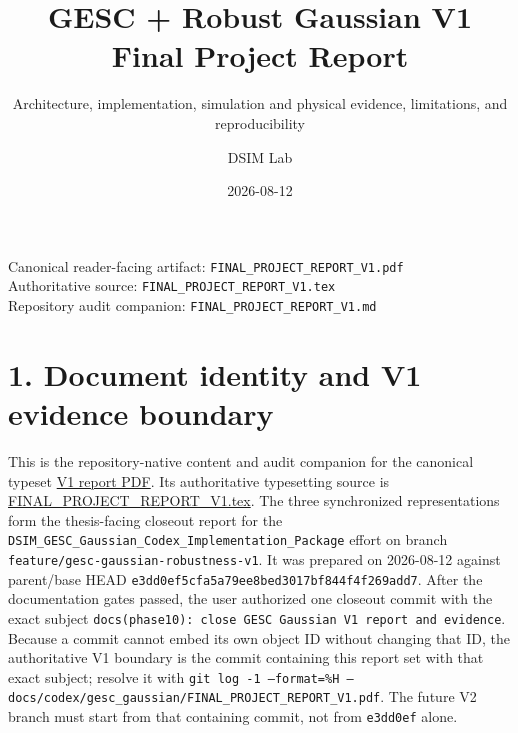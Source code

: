 \documentclass[
  10pt,
  letterpaper,
]{article}
\title{GESC + Robust Gaussian V1 Final Project Report}
\subtitle{Architecture, implementation, simulation and physical evidence, limitations, and reproducibility}
\author{DSIM Lab}
\date{2026-08-12}
\begin{document}
\maketitle
\thispagestyle{empty}

\begin{center}
\end{center}
\vfill
\begin{center}
\small Canonical reader-facing artifact: \texttt{FINAL\_PROJECT\_REPORT\_V1.pdf}\\
Authoritative source: \texttt{FINAL\_PROJECT\_REPORT\_V1.tex}\\
Repository audit companion: \texttt{FINAL\_PROJECT\_REPORT\_V1.md}
\end{center}
\newpage

{
\hypersetup{linkcolor=blue}
\setcounter{tocdepth}{3}
\tableofcontents
}
\section{1. Document identity and V1 evidence boundary}\label{document-identity-and-v1-evidence-boundary}

This is the repository-native content and audit companion for the canonical
typeset \href{FINAL_PROJECT_REPORT_V1.pdf}{V1 report PDF}. Its authoritative
typesetting source is \url{FINAL_PROJECT_REPORT_V1.tex}.
The three synchronized representations form the thesis-facing closeout report
for the
\nolinkurl{DSIM\_GESC\_Gaussian\_Codex\_Implementation\_Package} effort on branch
\nolinkurl{feature/gesc-gaussian-robustness-v1}. It was prepared on 2026-08-12 against
parent/base HEAD \nolinkurl{e3dd0ef5cfa5a79ee8bed3017bf844f4f269add7}. After the
documentation gates passed, the user authorized one closeout commit with the
exact subject \texttt{docs(phase10): close GESC Gaussian V1 report and evidence}.
Because a commit cannot embed its own object ID without changing that ID, the
authoritative V1 boundary is the commit containing this report set with that
exact subject; resolve it with
\texttt{git log -1 --format=\%H -- docs/codex/gesc\_gaussian/FINAL\_PROJECT\_REPORT\_V1.pdf}.
The future V2 branch must
start from that containing commit, not from \nolinkurl{e3dd0ef} alone.
\end{document}
